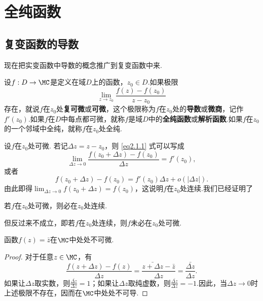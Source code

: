 \chapter{全纯函数\label{chap2}}
\section{复变函数的导数\label{sec2.1}}
现在把实变函数中导数的概念推广到复变函数中来.
\begin{definition}
  设$f:D\to\MC$是定义在域$D$上的函数，$z_0\in D$.如果极限
  \begin{equation}\label{eq2.1.1}
    \lim_{z\to z_0} \frac{f(z)-f(z_0)}{z-z_0}
  \end{equation}
  存在，就说$f$在$z_0$处\textbf{复可微}或\textbf{可微}，这个极限称为$f$在$z_0$处的\textbf{导数}或\textbf{微商}，记作$f'(z_0)$.如果$f$在$D$中每点都可微，就称$f$是域$D$中的\textbf{全纯函数}或\textbf{解析函数}.如果$f$在$z_0$的一个邻域中全纯，就称$f$在$z_0$处全纯.
\end{definition}

设$f$在$z_0$处可微. 若记$\Delta z=z-z_0$，则 \eqref{eq2.1.1} 式可以写成
\[
  \lim_{\Delta z\to0} \frac{f(z_0+\Delta z) - f(z_0)}{\Delta z} = f'(z_0),
\]
或者
\begin{equation}\label{eq2.1.2}
  f(z_0 + \Delta z) - f(z_0) = f'(z_0)\Delta z + o(|\Delta z|).
\end{equation}
由此即得$\lim_{\Delta z\to0}f(z_0+\Delta z)=f(z_0)$，这说明$f$在$z_0$处连续.我们已经证明了
\begin{prop}\label{prop2.1.2}
  若$f$在$z_0$处可微，则必在$z_0$处连续.
\end{prop}

但反过来不成立，即若$f$在$z_0$处连续，则$f$未必在$z_0$处可微.

\begin{example}
  函数$f(z)=\bar z$在$\MC$中处处不可微.
\end{example}
\begin{proof}
  对于任意$z\in\MC$，有
  \[
    \frac{f(z+\Delta z)-f(z)}{\Delta z} = \frac{\bar{z +\Delta z} - \bar z}{\Delta z} = \frac{\bar{\Delta z}}{\Delta z}.
  \]
  如果让$\Delta z$取实数，则$\frac{\bar{\Delta z}}{\Delta z}=1$；如果让$\Delta z$取纯虚数，则$\frac{\bar{\Delta z}}{\Delta z}=-1$.因此，当$\Delta z\to0$时上述极限不存在，因而在$\MC$中处处不可导.
\end{proof}

